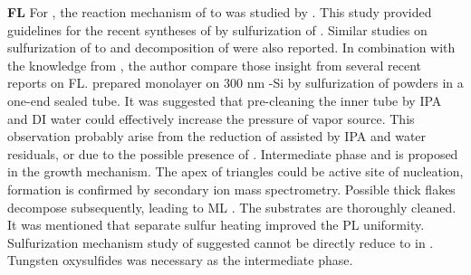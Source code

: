 \textbf{ FL} For , the reaction mechanism of  to  was studied by \citeauthor{Weber1996}.\cite{Weber1996} This study provided guidelines for the recent syntheses of  by sulfurization of .\cite{Lin2012,Lee2012b,Liu2012a,Najmaei2013} Similar studies on sulfurization of  to  and decomposition of  were also reported.\cite{VanderVlies2002,VanderVlies2002a} In combination with the knowledge from , the author compare those insight from several recent reports on  FL. \citeauthor{Cong2013} prepared monolayer  on 300 nm -Si by sulfurization of  powders in a one-end sealed tube.\cite{Cong2013} It was suggested that pre-cleaning the inner tube by IPA and DI water could effectively increase the pressure of vapor source. This observation probably arise from the reduction of  assisted by IPA and water residuals, or due to the possible presence of . Intermediate phase  and  is proposed in the growth mechanism. The apex of triangles could be active site of nucleation,  formation is confirmed by secondary ion mass spectrometry. Possible thick  flakes decompose subsequently, leading to ML . The substrates are thoroughly cleaned. It was mentioned that separate sulfur heating improved the PL uniformity. Sulfurization mechanism study of  suggested  cannot be directly reduce to  in .\cite{VanderVlies2002,VanderVlies2002a} Tungsten oxysulfides was necessary as the intermediate phase. 

